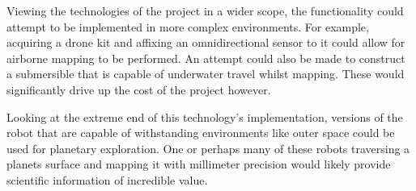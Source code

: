 		Viewing the technologies of the project in a wider scope, the functionality could attempt to be implemented in more complex environments. For example, acquiring a drone kit and affixing an omnidirectional sensor to it could allow for airborne mapping to be performed. An attempt could also be made to construct a submersible that is capable of underwater travel whilst mapping. These would significantly drive up the cost of the project however.
		
		Looking at the extreme end of this technology's implementation, versions of the robot that are capable of withstanding environments like outer space could be used for planetary exploration. One or perhaps many of these robots traversing a planets surface and mapping it with millimeter precision would likely provide scientific information of incredible value.
